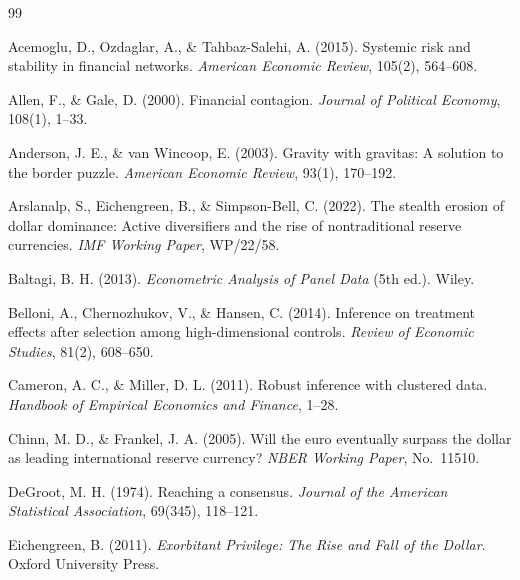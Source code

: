 \documentclass[12pt, letterpaper]{article}
\theoremstyle{definition}
\begin{document}
\begin{thebibliography}{99}

Acemoglu, D., Ozdaglar, A., \& Tahbaz-Salehi, A. (2015).
\newblock Systemic risk and stability in financial networks.
\newblock \textit{American Economic Review}, 105(2), 564--608.

Allen, F., \& Gale, D. (2000).
\newblock Financial contagion.
\newblock \textit{Journal of Political Economy}, 108(1), 1--33.

Anderson, J. E., \& van Wincoop, E. (2003).
\newblock Gravity with gravitas: A solution to the border puzzle.
\newblock \textit{American Economic Review}, 93(1), 170--192.

Arslanalp, S., Eichengreen, B., \& Simpson-Bell, C. (2022).
\newblock The stealth erosion of dollar dominance: Active diversifiers and the rise of nontraditional reserve currencies.
\newblock \textit{IMF Working Paper}, WP/22/58.

Baltagi, B. H. (2013).
\newblock \textit{Econometric Analysis of Panel Data} (5th ed.).
\newblock Wiley.

Belloni, A., Chernozhukov, V., \& Hansen, C. (2014).
\newblock Inference on treatment effects after selection among high-dimensional controls.
\newblock \textit{Review of Economic Studies}, 81(2), 608--650.

Cameron, A. C., \& Miller, D. L. (2011).
\newblock Robust inference with clustered data.
\newblock \textit{Handbook of Empirical Economics and Finance}, 1--28.

Chinn, M. D., \& Frankel, J. A. (2005).
\newblock Will the euro eventually surpass the dollar as leading international reserve currency?
\newblock \textit{NBER Working Paper}, No.~11510.

DeGroot, M. H. (1974).
\newblock Reaching a consensus.
\newblock \textit{Journal of the American Statistical Association}, 69(345), 118--121.

Eichengreen, B. (2011).
\newblock \textit{Exorbitant Privilege: The Rise and Fall of the Dollar}.
\newblock Oxford University Press.


\end{thebibliography}
\end{document}
